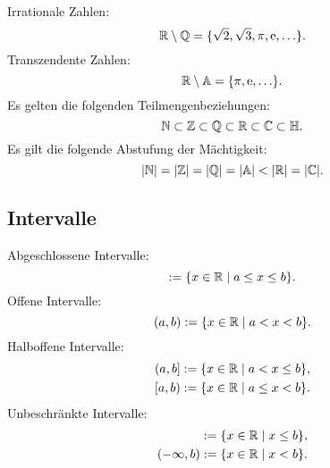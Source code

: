 Irrationale Zahlen:
\begin{equation}
\mathbb R\setminus\mathbb Q = \{\sqrt{2},\sqrt{3},\pi,\mathrm e,\ldots\}.
\end{equation}
Transzendente Zahlen:
\begin{equation}
\mathbb R\setminus\mathbb A = \{\pi,\mathrm e,\ldots\}.
\end{equation}
Es gelten die folgenden Teilmengenbeziehungen:
\begin{equation}
\mathbb N\subset\mathbb Z\subset\mathbb Q\subset\mathbb R\subset\mathbb C\subset\mathbb H.
\end{equation}
Es gilt die folgende Abstufung der Mächtigkeit:
\begin{equation}
|\mathbb N| = |\mathbb Z| = |\mathbb Q| = |\mathbb A| < |\mathbb R| = |\mathbb C|.
\end{equation}

\newpage
\subsection{Intervalle}
Abgeschlossene Intervalle:
\begin{equation}
[a,b] := \{x\in\R\mid a\le x\le b\}.
\end{equation}
Offene Intervalle:
\begin{equation}
(a,b) := \{x\in\mathbb R\mid a<x<b\}.
\end{equation}
Halboffene Intervalle:
\begin{align}
(a,b] &:= \{x\in\mathbb R\mid a<x\le b\},\\
[a,b) &:= \{x\in\mathbb R\mid a\le x<b\}.
\end{align}
Unbeschränkte Intervalle:
\begin{align}
[a,\infty) &:= \{x\in\R\mid a\le x\},\\
(a,\infty) &:= \{x\in\R\mid a<x\},\\
(-\infty,b] &:= \{x\in\R\mid x\le b\},\\
(-\infty,b) &:= \{x\in\R\mid x<b\}.
\end{align}

